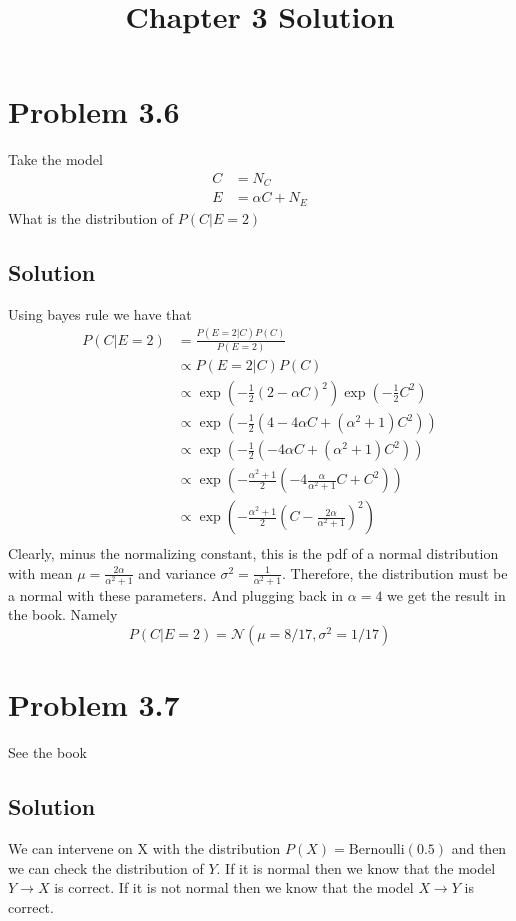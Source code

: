\documentclass[11pt]{article}
\title{Chapter 3 Solution}
\begin{document}
\maketitle

\section*{Problem 3.6}
Take the model 
\begin{align*}
    C &= N_C \\
    E &= \alpha C + N_E
\end{align*}
What is the distribution of $P(C | E = 2)$
\subsection*{Solution}
Using bayes rule we have that 
\begin{align*}
P(C | E = 2) &= \frac{P(E = 2 | C) P(C)}{P(E = 2)} \\
&\propto P(E = 2 | C) P(C) \\
&\propto \exp\left( -\frac{1}{2} (2 - \alpha C)^2 \right) \exp\left(-\frac{1}{2} C^2\right) \\
&\propto \exp\left( -\frac{1}{2} (4 - 4 \alpha C +  (\alpha^2 + 1) C^2) \right) \\
&\propto \exp\left( -\frac{1}{2} (- 4 \alpha C +  (\alpha^2 + 1) C^2) \right) \\
&\propto \exp\left( -\frac{\alpha ^2 + 1}{2 } (- 4 \frac{\alpha}{\alpha^2 + 1} C +  C^2) \right) \\
&\propto \exp\left( -\frac{\alpha ^2 + 1}{2 } \left(C -  \frac{2\alpha }{\alpha^2 + 1}\right)^2\right) \\
\end{align*}
Clearly, minus the normalizing constant, this is the pdf of a normal distribution with
 mean $\mu = \frac{2\alpha }{\alpha^2 + 1}$ and variance $\sigma^2 = \frac{1}{\alpha^2 + 1}$.
 Therefore, the distribution must be a normal with these parameters.
 And plugging back in $\alpha = 4$ we get the result in the book. Namely 
\[P(C | E = 2) = \mathcal{N}(\mu = 8/17, \sigma^2 = 1/17)\]

\section*{Problem 3.7}
See the book
\subsection*{Solution}
We can intervene on X with the distribution $P(X) = \text{Bernoulli}(0.5)$ and then we can check the distribution of $Y$.
If it is normal then we know that the model $Y \rightarrow X$ is correct. 
If it is not normal then we know that the model $X \rightarrow Y$ is correct.
\end{document}
